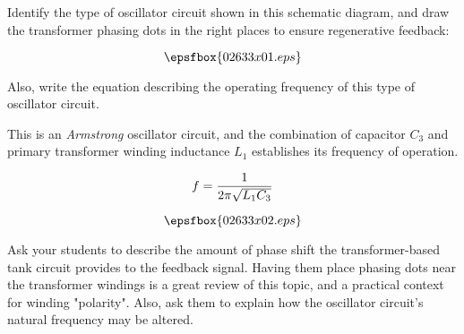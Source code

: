 

Identify the type of oscillator circuit shown in this schematic diagram, and draw the transformer phasing dots in the right places to ensure regenerative feedback:

$$\epsfbox{02633x01.eps}$$

Also, write the equation describing the operating frequency of this type of oscillator circuit.







This is an {\it Armstrong} oscillator circuit, and the combination of capacitor $C_3$ and primary transformer winding inductance $L_1$ establishes its frequency of operation.

$$f = {1 \over {2 \pi \sqrt{L_1 C_3}}}$$

$$\epsfbox{02633x02.eps}$$







Ask your students to describe the amount of phase shift the transformer-based tank circuit provides to the feedback signal.  Having them place phasing dots near the transformer windings is a great review of this topic, and a practical context for winding "polarity".  Also, ask them to explain how the oscillator circuit's natural frequency may be altered.




